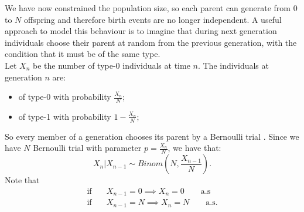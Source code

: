 \documentclass{article}
\begin{document}
	We have now constrained the population size, so each parent can generate from 0 to $N$ offspring and therefore birth events are no longer independent. A useful approach to model this behaviour is to imagine that during next generation individuals choose their parent at random from the previous generation, with the condition that it must be of the same type.\\
	Let $X_n$ be the number of type-0 individuals at time $n$. The individuals at generation $n$ are:
	\begin{itemize}
		\item of type-0 with probability $\frac{X_n}{N}$;
		\item of type-1 with probability $1-\frac{X_n}{N}$;
	\end{itemize}
	So every member of a generation chooses its parent by a Bernoulli trial . Since we have $N$ Bernoulli trial with parameter $p=\frac{X_n}{N}$, we have that:
	\[
	X_n|X_{n-1}\sim Binom(N,\frac{X_{n-1}}{N}).
	\]
	Note that 
	\begin{align*}
		\text{if}\quad &X_{n-1}=0 \implies X_n=0\qquad\text{a.s}\\
		\text{if}\quad &X_{n-1}=N \implies X_n=N\qquad\text{a.s}.
	\end{align*}
	
\end{document}
